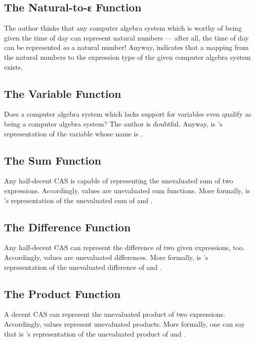 \documentclass{report}
\begin{document}
\subsection{The Natural-to-ε Function}
The author thinks that any computer algebra system which is worthy of being given the time of day can represent natural numbers --- after all, the time of day can be represented \emph{as} a natural number!  Anyway,  indicates that a mapping from the natural numbers to the expression type of the given computer algebra system exists.

\subsection{The Variable Function}
Does a computer algebra system which lacks support for variables even qualify as being a computer algebra system?  The author is doubtful.  Anyway,    is 's representation of the variable whose name is .

\subsection{The Sum Function}
Any half-decent CAS is capable of representing the unevaluated sum of two expressions.  Accordingly, \AgdaField{\AgdaUnderscore{}+\AgdaUnderscore{}} values are unevaluated sum functions.  More formally,     is 's representation of the unevaluated sum of  and .

\subsection{The Difference Function}
Any half-decent CAS can represent the difference of two given expressions, too.  Accordingly, \AgdaField{\AgdaUnderscore{}-\AgdaUnderscore{}} values are unevaluated differences.  More formally,     is 's representation of the unevaluated difference of  and .

\subsection{The Product Function}
A decent CAS can represent the unevaluated product of two expressions.  Accordingly, \AgdaField{\AgdaUnderscore{}*\AgdaUnderscore{}} values represent unevaluated products.  More formally, one can say that     is 's representation of the unevaluated product of  and .
\end{document}
